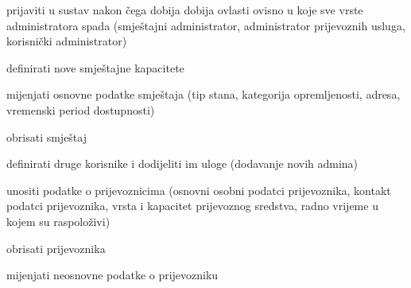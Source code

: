 			
			\begin{packed_enum}
				
				\item {}
				
				\begin{packed_enum}
					\item prijaviti u sustav nakon čega dobija dobija ovlasti ovisno u koje sve vrste administratora spada (smještajni administrator, administrator \mbox{prijevoznih} usluga, korisnički administrator)
					
				\end{packed_enum}		
				
				\item  {}
				
				\begin{packed_enum}
					
					\item definirati nove smještajne kapacitete
					\item mijenjati osnovne podatke smještaja (tip stana, kategorija opremljenosti, adresa, vremenski period dostupnosti)
					\item obrisati smještaj
					\item definirati druge korisnike i dodijeliti im uloge (dodavanje novih admina)		
					
				\end{packed_enum}
				
				
				
				\item  {}
				
				\begin{packed_enum}
					
					\item unositi podatke o prijevoznicima (osnovni osobni podatci prijevoznika, kontakt podatci prijevoznika, vrsta i kapacitet prijevoznog sredstva, radno vrijeme u kojem su raspoloživi)
					\item obrisati prijevoznika
					\item mijenjati neosnovne podatke o prijevozniku
					
				\end{packed_enum}
				
				\item {}
				
				\begin{packed_enum}
					

\end{packed_enum}
\end{packed_enum}
